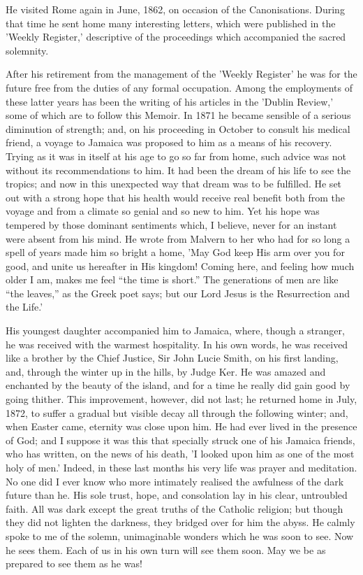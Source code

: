 He visited Rome again in June, 1862, on occasion
of the Canonisations. During that time he sent home many interesting
letters, which were published in the 'Weekly Register,'
descriptive of the proceedings which accompanied the sacred solemnity.

After his retirement from the management of the 'Weekly Register' he was for the future free from the duties of
any formal occupation. Among the employments of these latter years has
been the writing of his articles in the 'Dublin Review,' some
of which are to follow this Memoir. In 1871 he became sensible of a
serious diminution of strength; and, on his proceeding in October to
consult his medical friend, a voyage to Jamaica was proposed to him as
a means of his recovery. Trying as it was in itself at his age to go
so far from home, such advice was not without its recommendations to
him. It had been the dream of his life to see the tropics; and now in
this unexpected way that dream was to be fulfilled. He set out with a
strong hope that his health would receive real benefit both from the
voyage and from a climate so genial and so new to him. Yet his hope
was tempered by those dominant sentiments which, I believe, never for
an instant were absent from his mind. He wrote from Malvern to her who
had for so long a spell of years made him so bright a home, 'May God
keep His arm over you for good, and unite us hereafter in His kingdom!
Coming here, and feeling how much older I am, makes me feel ``the
time is short.'' The generations of men are like ``the leaves,'' as
the Greek poet says; but our Lord Jesus is the Resurrection and the
Life.'

His youngest daughter accompanied him to Jamaica,
where, though a stranger, he was received with the warmest
hospitality. In his own words, he was received like a brother by the
Chief Justice, Sir John Lucie Smith, on his first landing, and,
through the winter up in the hills, by Judge Ker. He was amazed and
enchanted by the beauty of the island, and for a time he really did
gain good by going thither. This improvement, however, did not last;
he returned home in July, 1872, to suffer a gradual but visible decay
all through the following winter; and, when Easter came, eternity
was close upon him. He had ever lived in the presence of God; and I
suppose it was this that specially struck one of his Jamaica friends,
who has written, on the news of his death, 'I looked upon him as one
of the most holy of men.' Indeed, in these last months his very life
was prayer and meditation. No one did I ever know who more intimately
realised the awfulness of the dark future than he. His sole trust,
hope, and consolation lay in his clear, untroubled faith. All was dark
except the great truths of the Catholic religion; but though they did
not lighten the darkness, they bridged over for him the abyss. He
calmly spoke to me of the solemn, unimaginable wonders which he was
soon to see. Now he sees them. Each of us in his own turn will see
them soon. May we be as prepared to see them as he was!


